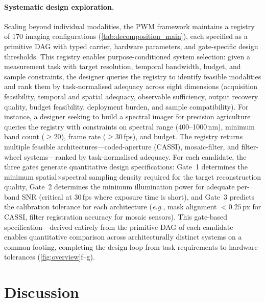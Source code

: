 \documentclass[11pt]{article}
\newcommand{\eg}{\textit{e.g.}}
\begin{document}
\paragraph{Systematic design exploration.}
\begin{sloppypar}
Scaling beyond individual modalities, the PWM framework maintains a registry of 170 imaging configurations (\cref{tab:decomposition_main}), each specified as a primitive DAG with typed carrier, hardware parameters, and gate-specific design thresholds. This registry enables purpose-conditioned system selection: given a measurement task with target resolution, temporal bandwidth, budget, and sample constraints, the designer queries the registry to identify feasible modalities and rank them by task-normalised adequacy across eight dimensions (acquisition feasibility, temporal and spatial adequacy, observable sufficiency, output recovery quality, budget feasibility, deployment burden, and sample compatibility). For instance, a designer seeking to build a spectral imager for precision agriculture queries the registry with constraints on spectral range (400--1000\,nm), minimum band count ($\geq 20$), frame rate ($\geq 30$\,fps), and budget. The registry returns multiple feasible architectures---coded-aperture (CASSI), mosaic-filter, and filter-wheel systems---ranked by task-normalised adequacy. For each candidate, the three gates generate quantitative design specifications: Gate~1 determines the minimum spatial$\times$spectral sampling density required for the target reconstruction quality, Gate~2 determines the minimum illumination power for adequate per-band SNR (critical at 30\,fps where exposure time is short), and Gate~3 predicts the calibration tolerance for each architecture (\eg{}, mask alignment $< 0.25$\,px for CASSI, filter registration accuracy for mosaic sensors). This gate-based specification---derived entirely from the primitive DAG of each candidate---enables quantitative comparison across architecturally distinct systems on a common footing, completing the design loop from task requirements to hardware tolerances (\cref{fig:overview}f--g).
\end{sloppypar}


\FloatBarrier
\section*{Discussion}
\end{document}
